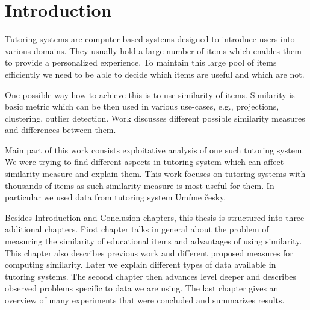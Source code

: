 \documentclass[
  digital, %
  table,   %
  nolof,     %
  nolot,     %
  nocover,
  color
]{fithesis3}
\begin{document}
\newcommand{\ppl}[1]{\textcolor[rgb]{0.6,0.2,1.0}{#1}}
\newcommand{\umimeCesky}{Umíme česky}



\chapter*{Introduction}



Tutoring systems are computer-based systems designed to introduce users into various domains. They usually hold a large number of items which enables them to provide a personalized experience. To maintain this large pool of items efficiently we need to be able to decide which items are useful and which are not.


One possible way how to achieve this is to use similarity of items. Similarity is basic metric which can be then used in various use-cases, e.g., projections, clustering, outlier detection. Work discusses different possible similarity measures and differences between them.



Main part of this work consists exploitative analysis of one such tutoring system. We were trying to find different aspects in tutoring system which can affect similarity measure and explain them. This work focuses on tutoring systems with thousands of items as such similarity measure is most useful for them. In particular we used data from tutoring system \umimeCesky{}.


Besides Introduction and Conclusion chapters, this thesis is structured into three additional chapters. First chapter talks in general about the problem of measuring the similarity of educational items and advantages of using similarity. This chapter also describes previous work and different proposed measures for computing similarity. Later we explain different types of data available in tutoring systems. The second chapter then advances level deeper and describes observed problems specific to data we are using.
The last chapter gives an overview of many experiments that were concluded and summarizes results.
\end{document}
